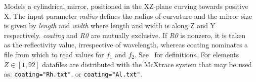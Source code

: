 Models a cylindrical mirror, positioned in the XZ-plane curving towards
positive X. The input parameter \textit{radius} defines the radius of curvature
and the mirror size is given by \textit{length} and \textit{width} where length
and width is along Z and Y respectively. \textit{coating} and \textit{R0} are mutually
exclusive. If \textit{R0} is nonzero, it is taken as the reflectivity value,
irrespective of wavelength, whereas coating nominates a file from which to read
values for $f_1$ and $f_2$. See~\cite{NIST-ffast} for definitions. For
elements $Z\in[1,92]$ datafiles are distributed with the McXtrace system that
may be used as: \verb+coating="Rh.txt"+. or \verb+coating="Al.txt"+. 
